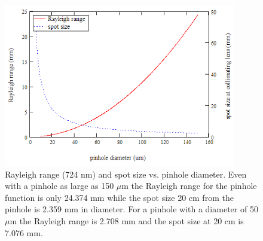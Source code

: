 \begin{figure}
\centering
\includegraphics[width=4.00in]
{spot_size/spot_size.png}
\caption[Rayleigh range (724 nm) and spot size vs. pinhole diameter]{Rayleigh range (724 nm) and spot size vs. pinhole diameter. Even with a pinhole as large as 150 $\mu$m the Rayleigh range for the pinhole function is only 24.374 mm while the spot size 20 cm from the pinhole is 2.359 mm in diameter. For a pinhole with a diameter of 50 $\mu$m the Rayleigh range is 2.708 mm and the spot size at 20 cm is 7.076 mm.}
\label{spot_size}
\end{figure} 
